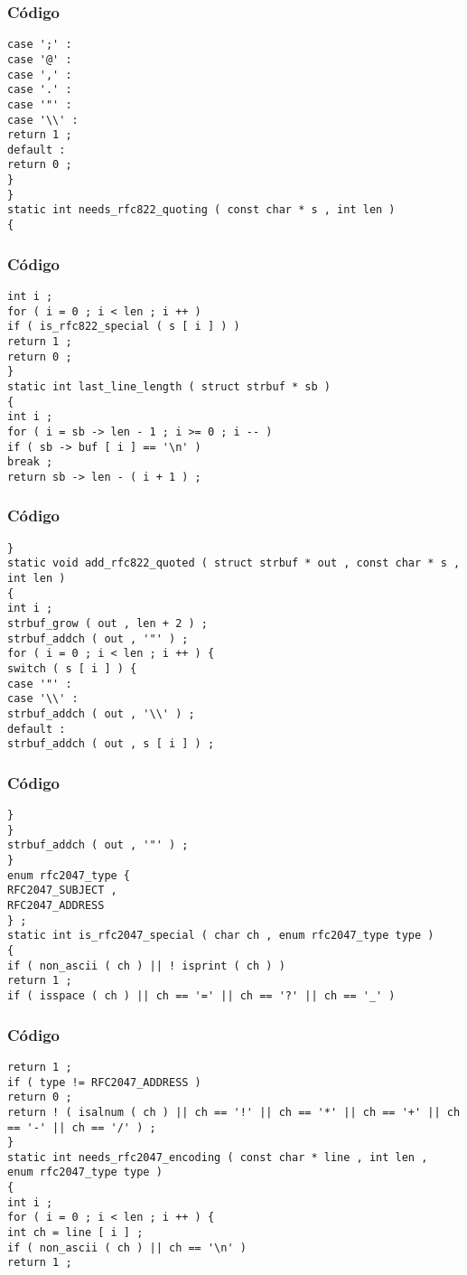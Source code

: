 \documentclass{beamer}
\begin{document}
\begin{frame}[fragile]
\frametitle{C\'odigo}
\begin{verbatim}
case ';' : 
case '@' : 
case ',' : 
case '.' : 
case '"' : 
case '\\' : 
return 1 ; 
default : 
return 0 ; 
} 
} 
static int needs_rfc822_quoting ( const char * s , int len ) 
{ 
\end{verbatim}
\end{frame}
\begin{frame}[fragile]
\frametitle{C\'odigo}
\begin{verbatim}
int i ; 
for ( i = 0 ; i < len ; i ++ ) 
if ( is_rfc822_special ( s [ i ] ) ) 
return 1 ; 
return 0 ; 
} 
static int last_line_length ( struct strbuf * sb ) 
{ 
int i ; 
for ( i = sb -> len - 1 ; i >= 0 ; i -- ) 
if ( sb -> buf [ i ] == '\n' ) 
break ; 
return sb -> len - ( i + 1 ) ; 
\end{verbatim}
\end{frame}
\begin{frame}[fragile]
\frametitle{C\'odigo}
\begin{verbatim}
} 
static void add_rfc822_quoted ( struct strbuf * out , const char * s , int len ) 
{ 
int i ; 
strbuf_grow ( out , len + 2 ) ; 
strbuf_addch ( out , '"' ) ; 
for ( i = 0 ; i < len ; i ++ ) { 
switch ( s [ i ] ) { 
case '"' : 
case '\\' : 
strbuf_addch ( out , '\\' ) ; 
default : 
strbuf_addch ( out , s [ i ] ) ; 
\end{verbatim}
\end{frame}
\begin{frame}[fragile]
\frametitle{C\'odigo}
\begin{verbatim}
} 
} 
strbuf_addch ( out , '"' ) ; 
} 
enum rfc2047_type { 
RFC2047_SUBJECT , 
RFC2047_ADDRESS 
} ; 
static int is_rfc2047_special ( char ch , enum rfc2047_type type ) 
{ 
if ( non_ascii ( ch ) || ! isprint ( ch ) ) 
return 1 ; 
if ( isspace ( ch ) || ch == '=' || ch == '?' || ch == '_' ) 
\end{verbatim}
\end{frame}
\begin{frame}[fragile]
\frametitle{C\'odigo}
\begin{verbatim}
return 1 ; 
if ( type != RFC2047_ADDRESS ) 
return 0 ; 
return ! ( isalnum ( ch ) || ch == '!' || ch == '*' || ch == '+' || ch == '-' || ch == '/' ) ; 
} 
static int needs_rfc2047_encoding ( const char * line , int len , 
enum rfc2047_type type ) 
{ 
int i ; 
for ( i = 0 ; i < len ; i ++ ) { 
int ch = line [ i ] ; 
if ( non_ascii ( ch ) || ch == '\n' ) 
return 1 ; 
\end{verbatim}
\end{frame}
\end{document}
